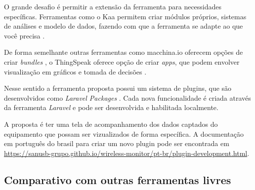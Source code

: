 O grande desafio é permitir a extensão da ferramenta para necessidades
específicas. Ferramentas como o Kaa permitem criar módulos próprios,
sistemas de análises e modelo de dados, fazendo com que a ferramenta se
adapte ao que você precisa \cite{kaa-2014}.

De forma semelhante outras ferramentas como macchina.io oferecem opções
de criar \emph{bundles} \cite{macchina.io-2016}, o ThingSpeak oferece
opção de criar \emph{apps}, que podem envolver visualização em gráficos
e tomada de decisões \cite{thingspeak-2016}.

Nesse sentido a ferramenta proposta possui um sistema de plugins, que
são desenvolvidos como \emph{Laravel Packages}
\cite{laravel-packages-2016}. Cada nova funcionalidade é criada através
da ferramenta \emph{Laravel} e pode ser desenvolvida e habilitada
localmente.

A proposta é ter uma tela de acompanhamento dos dados captados do
equipamento que possam ser vizualizados de forma específica. A
documentação em português do brasil para criar um novo plugin pode ser
encontrada em
\url{https://sanusb-grupo.github.io/wireless-monitor/pt-br/plugin-development.html}.

\subsection{Comparativo com outras ferramentas
livres}\label{comparativo-com-outras-ferramentas-livres}


